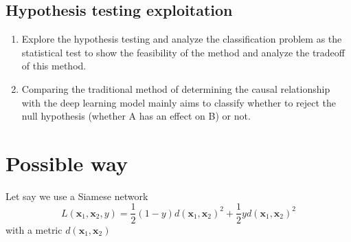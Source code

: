 \documentclass{article}
\begin{document}
\subsection{Hypothesis testing exploitation}
\begin{enumerate}
    \item Explore the hypothesis testing and analyze the classification problem as the 
    statistical test to show the feasibility of the method and analyze the tradeoff of this 
    method.
    \item Comparing the traditional method of determining the causal relationship with the 
    deep learning model mainly aims to classify whether to reject the null hypothesis 
    (whether A has an effect on B) or not.
\end{enumerate}

\section{Possible way}

Let say we use a Siamese network
$$L(\mathbf{x}_1, \mathbf{x}_2, y) = \frac{1}{2}(1-y)d(\mathbf{x}_1, \mathbf{x}_2)^2 + \frac{1}{2}yd(\mathbf{x}_1, \mathbf{x}_2)^2
$$
with a metric $d(\mathbf{x}_1, \mathbf{x}_2)$

\end{document}
